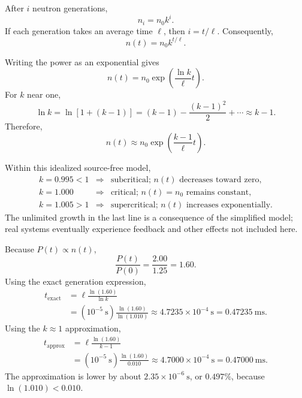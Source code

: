 \begin{draftsolution}
After $i$ neutron generations,
\[
 n_i=n_0k^i.
\]
If each generation takes an average time $\ell$, then $i=t/\ell$.
Consequently,
\[
 \boxed{n(t)=n_0k^{t/\ell}}.
\]

Writing the power as an exponential gives
\[
 n(t)=n_0\exp\left(\frac{\ln k}{\ell}t\right).
\]
For $k$ near one,
\[
 \ln k=\ln\!\left[1+(k-1)\right]
       =(k-1)-\frac{(k-1)^2}{2}+\cdots\approx k-1.
\]
Therefore,
\[
 \boxed{n(t)\approx n_0\exp\left(\frac{k-1}{\ell}t\right)}.
\]

Within this idealized source-free model,
\[
\begin{array}{ccl}
 k=0.995<1&\Longrightarrow&\text{subcritical; }n(t)\text{ decreases toward zero},\\[1mm]
 k=1.000&\Longrightarrow&\text{critical; }n(t)=n_0\text{ remains constant},\\[1mm]
 k=1.005>1&\Longrightarrow&\text{supercritical; }n(t)\text{ increases exponentially}.
\end{array}
\]
The unlimited growth in the last line is a consequence of the simplified
model; real systems eventually experience feedback and other effects not
included here.

Because $P(t)\propto n(t)$,
\[
 \frac{P(t)}{P(0)}=\frac{2.00}{1.25}=1.60.
\]
Using the exact generation expression,
\begin{align*}
 t_{\mathrm{exact}}
 &=\ell\frac{\ln(1.60)}{\ln k}\\
 &=(10^{-5}\ \mathrm{s})\frac{\ln(1.60)}{\ln(1.010)}
 \approx\boxed{4.7235\times10^{-4}\ \mathrm{s}}
 =\boxed{0.47235\ \mathrm{ms}}.
\end{align*}
Using the $k\approx1$ approximation,
\begin{align*}
 t_{\mathrm{approx}}
 &=\ell\frac{\ln(1.60)}{k-1}\\
 &=(10^{-5}\ \mathrm{s})\frac{\ln(1.60)}{0.010}
 \approx\boxed{4.7000\times10^{-4}\ \mathrm{s}}
 =\boxed{0.47000\ \mathrm{ms}}.
\end{align*}
The approximation is lower by about $2.35\times10^{-6}\ \mathrm{s}$, or
$0.497\%$, because $\ln(1.010)<0.010$.
\end{draftsolution}

\clearpage
